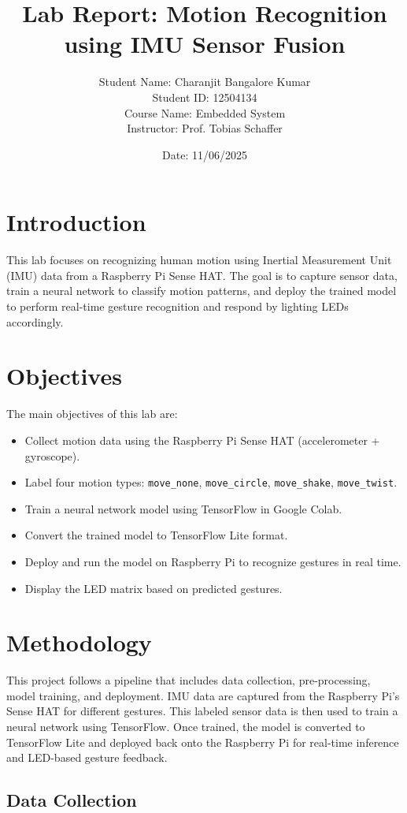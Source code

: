 \documentclass[a4paper,12pt]{article}
\title{Lab Report: \textbf{Motion Recognition using IMU Sensor Fusion}}
\author{Student Name: Charanjit Bangalore Kumar \\ Student ID: 12504134 \\ Course Name: Embedded System \\ Instructor: Prof. Tobias Schaffer}
\date{Date: 11/06/2025}
\begin{document}
\maketitle

\section{Introduction}
This lab focuses on recognizing human motion using Inertial Measurement Unit (IMU) data from a Raspberry Pi Sense HAT. The goal is to capture sensor data, train a neural network to classify motion patterns, and deploy the trained model to perform real-time gesture recognition and respond by lighting LEDs accordingly.
\section{Objectives}
The main objectives of this lab are:
\begin{itemize}
    \item Collect motion data using the Raspberry Pi Sense HAT (accelerometer + gyroscope).
    \item Label four motion types: \texttt{move\_none}, \texttt{move\_circle}, \texttt{move\_shake}, \texttt{move\_twist}.
    \item Train a neural network model using TensorFlow in Google Colab.
    \item Convert the trained model to TensorFlow Lite format.
    \item Deploy and run the model on Raspberry Pi to recognize gestures in real time.
    \item Display the LED matrix based on predicted gestures.
\end{itemize}


\section{Methodology}
This project follows a pipeline that includes data collection, pre-processing, model training, and deployment. IMU data are captured from the Raspberry Pi's Sense HAT for different gestures. This labeled sensor data is then used to train a neural network using TensorFlow. Once trained, the model is converted to TensorFlow Lite and deployed back onto the Raspberry Pi for real-time inference and LED-based gesture feedback.

\subsection{Data Collection}
\end{document}
